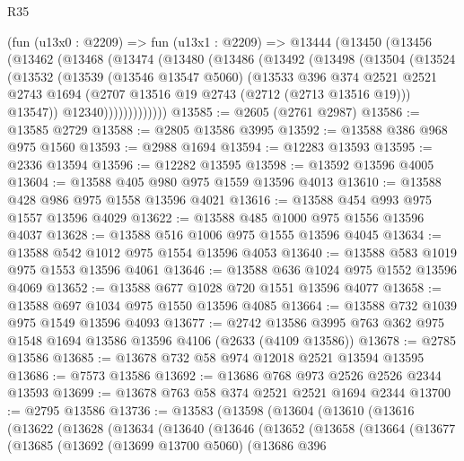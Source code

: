 \begin{lexlean}{R35}
\begin{coremodule}
    (fun (u13x0 : @2209) =>
    fun (u13x1 : @2209) =>
    @13444
      (@13450
        (@13456
          (@13462
            (@13468
              (@13474
                (@13480
                  (@13486
                    (@13492
                      (@13498
                        (@13504
                          (@13524
                            (@13532
                              (@13539
                                (@13546 @13547 @5060)
                                (@13533
                                  @396
                                  @374
                                  @2521
                                  @2521
                                  @2743
                                  @1694
                                  (@2707 @13516 @19 @2743 (@2712 (@2713 @13516 @19)))
                                  @13547))
                              @12340)))))))))))))
@13585 := @2605 (@2761 @2987)
@13586 := @13585 @2729
@13588 := @2805 @13586 @3995
@13592 := @13588 @386 @968 @975 @1560
@13593 := @2988 @1694
@13594 := @12283 @13593
@13595 := @2336 @13594
@13596 := @12282 @13595
@13598 := @13592 @13596 @4005
@13604 := @13588 @405 @980 @975 @1559 @13596 @4013
@13610 := @13588 @428 @986 @975 @1558 @13596 @4021
@13616 := @13588 @454 @993 @975 @1557 @13596 @4029
@13622 := @13588 @485 @1000 @975 @1556 @13596 @4037
@13628 := @13588 @516 @1006 @975 @1555 @13596 @4045
@13634 := @13588 @542 @1012 @975 @1554 @13596 @4053
@13640 := @13588 @583 @1019 @975 @1553 @13596 @4061
@13646 := @13588 @636 @1024 @975 @1552 @13596 @4069
@13652 := @13588 @677 @1028 @720 @1551 @13596 @4077
@13658 := @13588 @697 @1034 @975 @1550 @13596 @4085
@13664 := @13588 @732 @1039 @975 @1549 @13596 @4093
@13677 := @2742 @13586 @3995 @763 @362 @975 @1548 @1694 @13586 @13596 @4106 (@2633 (@4109 @13586))
@13678 := @2785 @13586
@13685 := @13678 @732 @58 @974 @12018 @2521 @13594 @13595
@13686 := @7573 @13586
@13692 := @13686 @768 @973 @2526 @2526 @2344 @13593
@13699 := @13678 @763 @58 @374 @2521 @2521 @1694 @2344
@13700 := @2795 @13586
@13736 := @13583
    (@13598
      (@13604
        (@13610
          (@13616
            (@13622
              (@13628
                (@13634
                  (@13640
                    (@13646
                      (@13652
                        (@13658
                          (@13664
                            (@13677
                              (@13685
                                (@13692
                                  (@13699 @13700 @5060)
                                  (@13686
                                    @396

\end{coremodule}
\end{lexlean}
